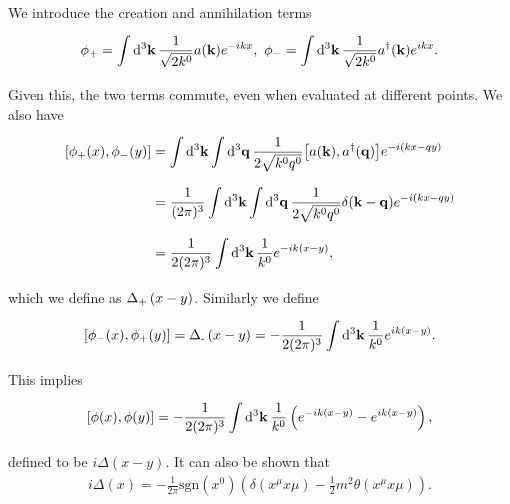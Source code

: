 We introduce the creation and annihilation terms
\begin{align*}
	\phi_{+} = \integ[3]{}{}{\vb{k}}{\frac{1}{\sqrt{2k^{0}}}a(\vb{k})e^{-ikx}},\ \phi_{-} = \integ[3]{}{}{\vb{k}}{\frac{1}{\sqrt{2k^{0}}}a\adj(\vb{k})e^{ikx}}.
\end{align*}
Given this, the two terms commute, even when evaluated at different points. We also have
\begin{align*}
	\comm{\phi_{+}(x)}{\phi_{-}(y)} &= \integ[3]{}{}{\vb{k}}{\integ[3]{}{}{\vb{q}}{\frac{1}{2\sqrt{k^{0}q^{0}}}\comm{a(\vb{k})}{a\adj(\vb{q})}e^{-i(kx - qy)}}} \\
	                                &= \frac{1}{(2\pi)^{3}}\integ[3]{}{}{\vb{k}}{\integ[3]{}{}{\vb{q}}{\frac{1}{2\sqrt{k^{0}q^{0}}}\delta(\vb{k} - \vb{q})e^{-i(kx - qy)}}} \\
	                                &= \frac{1}{2(2\pi)^{3}}\integ[3]{}{}{\vb{k}}{\frac{1}{k^{0}}e^{-ik(x - y)}},
\end{align*}
which we define as $\Delta_{\text{+}}\left(x - y\right)$. Similarly we define
\begin{align*}
	\comm{\phi_{-}(x)}{\phi_{+}(y)} = \kgprop{-}{x - y} = -\frac{1}{2(2\pi)^{3}}\integ[3]{}{}{\vb{k}}{\frac{1}{k^{0}}e^{ik(x - y)}}.
\end{align*}
This implies
\begin{align*}
	\comm{\phi(x)}{\phi(y)} = -\frac{1}{2(2\pi)^{3}}\integ[3]{}{}{\vb{k}}{\frac{1}{k^{0}}\left(e^{-ik(x - y)} - e^{ik(x - y)}\right)},
\end{align*}
defined to be $i\Delta(x - y)$. It can also be shown that
\begin{align*}
	i\Delta(x) = -\frac{1}{2\pi}\text{sgn}(x^{0})(\delta(x^{\mu}x{\mu}) - \frac{1}{2}m^{2}\theta(x^{\mu}x{\mu})).
\end{align*}

